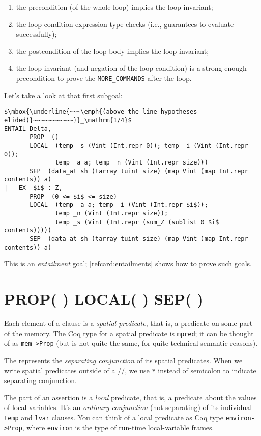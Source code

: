 \documentclass[12pt,fleqn,openany,oneside,showtrims]{memoir}
\begin{document}
\vspace{-\topsep}
\begin{enumerate}
\item the precondition (of the whole loop) implies the loop invariant;
\item the loop-condition expression type-checks (i.e., guarantees to evaluate successfully);
\item the postcondition of the loop body implies the loop invariant;
\item the loop invariant (and negation of the loop condition) is a
  strong enough
  precondition to prove the \lstinline{MORE_COMMANDS} after the loop.
\end{enumerate}
Let's take a look at that first subgoal:
\begin{lstlisting}
$\mbox{\underline{~~~\emph{(above-the-line hypotheses elided)}~~~~~~~~~~~}}_\mathrm{1/4}$
ENTAIL Delta,
       PROP  ()
       LOCAL  (temp _s (Vint (Int.repr 0)); temp _i (Vint (Int.repr 0));
              temp _a a; temp _n (Vint (Int.repr size)))
       SEP  (data_at sh (tarray tuint size) (map Vint (map Int.repr contents)) a)
|-- EX  $i$ : Z,
       PROP  (0 <= $i$ <= size)
       LOCAL  (temp _a a; temp _i (Vint (Int.repr $i$));
              temp _n (Vint (Int.repr size));
              temp _s (Vint (Int.repr (sum_Z (sublist 0 $i$ contents)))))
       SEP  (data_at sh (tarray tuint size) (map Vint (map Int.repr contents)) a)
\end{lstlisting}
This is an \emph{entailment} goal; \autoref{refcard:entailments}
shows how to prove such goals.

\chapter{\upshape PROP( ) LOCAL( ) SEP( )}
\label{refcard:prop-local-sep}
\label{refcard:predicates}

Each element of a \SEP{} clause is a
\emph{spatial predicate}, that is,
a predicate on some part of the memory.
The Coq type for a spatial predicate
is \lstinline{mpred}; it
can be thought of as \lstinline{mem->Prop} (but is not quite
the same, for quite technical semantic reasons).

The \SEP{} represents the \emph{separating conjunction}
of its spatial predicates.
When we write spatial predicates outside of a
\PROP/\LOCAL/\SEP{}, we use \lstinline{*} instead of
semicolon to indicate separating conjunction.

The \LOCAL{} part of an assertion is a
\emph{local} predicate, that is, a predicate about the values
of local variables.  It's an \emph{ordinary conjunction}
(not separating) of its individual \lstinline{temp}
and \lstinline{lvar} clauses.
You can think of a local predicate as Coq type
\lstinline{environ->Prop}, where \lstinline{environ} is
the type of run-time local-variable frames.
\end{document}
